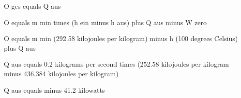 O ges equals Q aus

O equals m min times (h ein minus h aus) plus Q aus minus W zero

O equals m min (292.58 kilojoules per kilogram) minus h (100 degrees Celsius) plus Q aus

Q aus equals 0.2 kilograms per second times (252.58 kilojoules per kilogram minus 436.384 kilojoules per kilogram)

Q aus equals minus 41.2 kilowatts